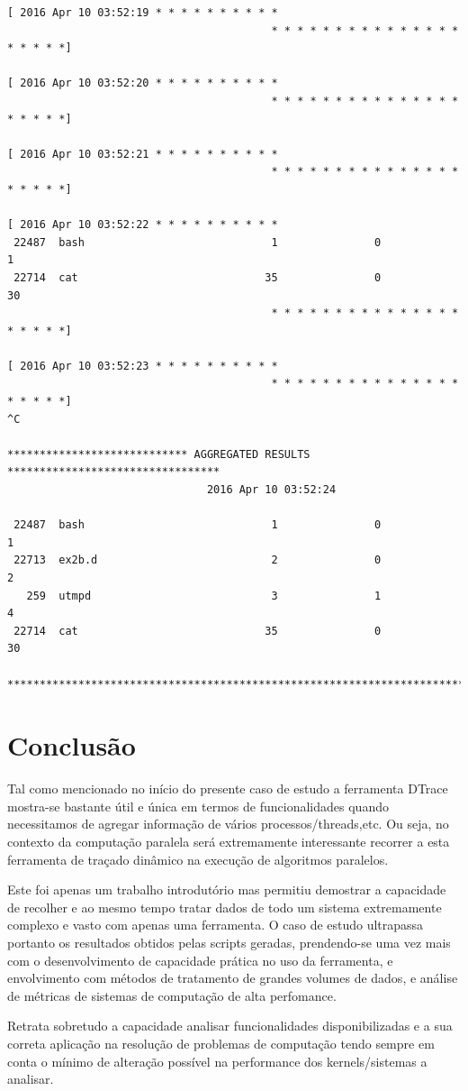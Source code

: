 \documentclass[a4paper]{article}
\begin{document}
\begin{lstlisting}[basicstyle=\scriptsize]
[ 2016 Apr 10 03:52:19 * * * * * * * * * * 
                                         * * * * * * * * * * * * * * * * * * * *]

[ 2016 Apr 10 03:52:20 * * * * * * * * * * 
                                         * * * * * * * * * * * * * * * * * * * *]

[ 2016 Apr 10 03:52:21 * * * * * * * * * * 
                                         * * * * * * * * * * * * * * * * * * * *]

[ 2016 Apr 10 03:52:22 * * * * * * * * * * 
 22487  bash                             1               0               1
 22714  cat                             35               0              30
                                         * * * * * * * * * * * * * * * * * * * *]

[ 2016 Apr 10 03:52:23 * * * * * * * * * * 
                                         * * * * * * * * * * * * * * * * * * * *]
^C

**************************** AGGREGATED RESULTS *********************************
                               2016 Apr 10 03:52:24 

 22487  bash                             1               0               1
 22713  ex2b.d                           2               0               2
   259  utmpd                            3               1               4
 22714  cat                             35               0              30

*********************************************************************************
 \end{lstlisting}
 
 
 
\newpage
\section{Conclusão}
Tal como mencionado no início do presente caso de estudo a ferramenta DTrace mostra-se bastante útil e única em termos de funcionalidades quando necessitamos de agregar informação de vários processos/threads,etc. Ou seja, no contexto da computação paralela será extremamente interessante recorrer a esta ferramenta de traçado dinâmico na execução de algoritmos paralelos. \par 
Este foi apenas um trabalho introdutório mas permitiu demostrar a capacidade de recolher e ao mesmo tempo tratar dados de todo um sistema extremamente complexo e vasto com apenas uma ferramenta. O caso de estudo ultrapassa portanto os resultados obtidos pelas scripts geradas, prendendo-se uma vez mais com o desenvolvimento de capacidade  prática no uso da ferramenta, e envolvimento com métodos de tratamento de grandes volumes de dados, e análise de métricas de sistemas de computação de alta perfomance.\par Retrata sobretudo a capacidade analisar funcionalidades disponibilizadas e a sua correta aplicação na resolução de problemas de computação tendo sempre em conta o mínimo de alteração possível na performance dos kernels/sistemas a analisar.
\end{document}

